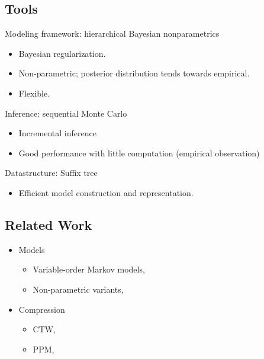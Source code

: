 \documentclass[16pt]{beamer}
\begin{document}
\subsection{Tools}

\begin{frame}[t]{}
Modeling framework: hierarchical Bayesian nonparametrics \cite{Teh2006b,Pitman1999,Ho2006}
\begin{itemize}
\item Bayesian regularization.
\item Non-parametric; posterior distribution tends towards empirical. 
\item Flexible.
\end{itemize}
Inference: sequential Monte Carlo \cite{Doucet2001,Liu2001,MacEachern1999}
\begin{itemize}
\item Incremental inference
\item Good performance with little computation (empirical observation)
\end{itemize}
Datastructure: Suffix tree \cite{Ukkonen1995}
\begin{itemize}
\item Efficient model construction and representation.
\end{itemize}




\end{frame}	

\subsection{Related Work}
\begin{frame}[t]{}
\begin{itemize}

\item Models
\begin{itemize}
\item Variable-order Markov models, \citet{Begleiter2004}
\item Non-parametric variants, \citet{Mochihashi2008}
\end{itemize}

\item Compression
\begin{itemize}
\item CTW, \citet{Willems2009,Willems1998}
\item PPM,  \citet{Bunton1997,Cleary1997,Wu2007}
\end{itemize}


\end{itemize}

\end{frame}	
\end{document}

